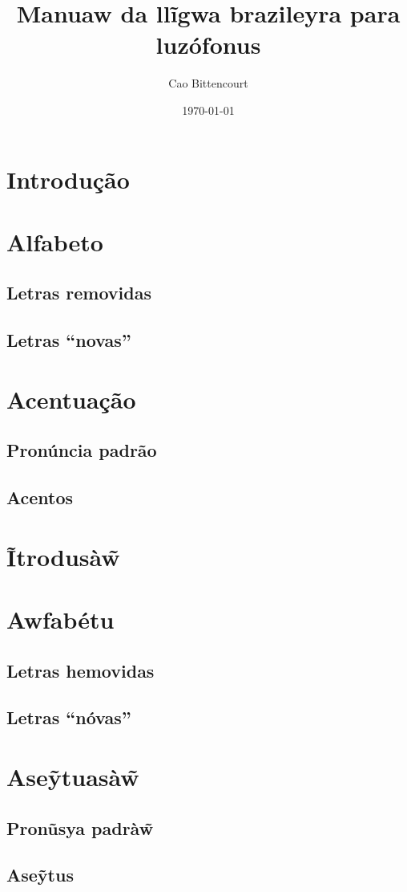 \documentclass[12pt, a4paper]{article}
\title{Manuaw da llĩgwa brazileyra para luzófonus}
\author{Cao Bittencourt}
\date{\today}
\begin{document}
\maketitle
\thispagestyle{empty}
\thispagestyle{empty}
\newpage

\begin{bilingualpages}
    \rightpage
    \section{Introdução}
    
    \section{Alfabeto}
    \AbcPtBr
    
    \subsection{Letras removidas}
    \subsection{Letras ``novas''}
    
    \section{Acentuação}
    \subsection{Pronúncia padrão}
    \subsection{Acentos}
    
    \leftpage
    \section{Ĩtrodusà\~{w}}
    
    \section{Awfabétu}
    \AbcBrbr
    \subsection{Letras hemovidas}
    \subsection{Letras ``nóvas''}

    \section{Ase\~ytuasà\~w}
    \subsection{Pronũsya padrà\~w}
    \subsection{Ase\~ytus}
\end{bilingualpages}
\end{document}
